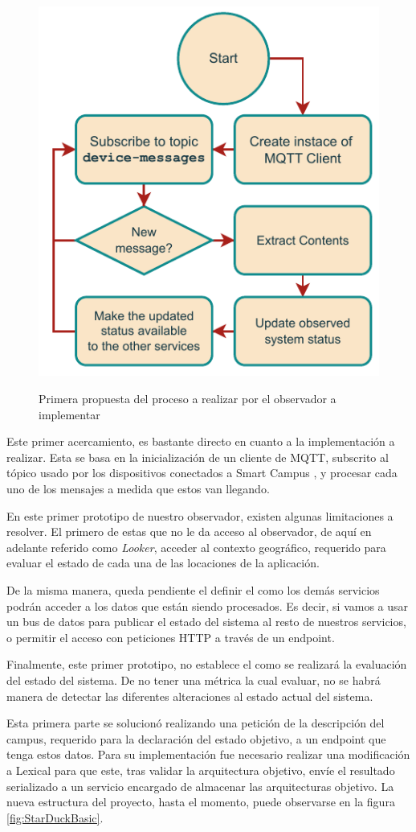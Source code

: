 \begin{figure}[H]
    \caption{Primera propuesta del proceso a realizar \linebreak por el observador a implementar} 
    \centering
    \includegraphics[width=0.6\linewidth]{images/LookerProcess.pdf}
    \label{fig:proceso_looker}
\end{figure}

Este primer acercamiento, es bastante directo en cuanto a la implementación a realizar. Esta se basa en la inicialización de un cliente de MQTT, subscrito al tópico usado por los dispositivos conectados a Smart Campus \cite{SmartCampusGithub}, y procesar cada uno de los mensajes a medida que estos van llegando.

En este primer prototipo de nuestro observador, existen algunas limitaciones a resolver. El primero de estas que no le da acceso al observador, de aquí en adelante referido como \textit{Looker}, acceder al contexto geográfico, requerido para evaluar el estado de cada una de las locaciones de la aplicación. 

De la misma manera, queda pendiente el definir el como los demás servicios podrán acceder a los datos que están siendo procesados. Es decir, si vamos a usar un bus de datos para publicar el estado del sistema al resto de nuestros servicios, o permitir el acceso con peticiones HTTP a través de un endpoint.

Finalmente, este primer prototipo, no establece el como se realizará la evaluación del estado del sistema. De no tener una métrica la cual evaluar, no se habrá manera de detectar las diferentes alteraciones al estado actual del sistema.

Esta primera parte se solucionó realizando una petición de la descripción del campus, requerido para la declaración del estado objetivo, a un endpoint que tenga estos datos. Para su implementación fue necesario realizar una modificación a Lexical para que este, tras validar la arquitectura objetivo, envíe el resultado serializado a un servicio encargado de almacenar las arquitecturas objetivo. La nueva estructura del proyecto, hasta el momento, puede observarse en la figura \ref{fig:StarDuckBasic}.

